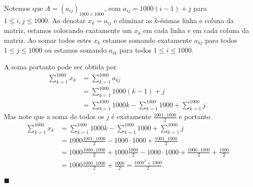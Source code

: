 \documentclass[a4paper,11pt]{report}
\renewcommand{\baselinestretch}{1.3}   %
\newenvironment{solucao}{ \vspace{.5\baselineskip} \renewcommand{\baselinestretch}{1}
                           \noindent {\bfseries Solução:} }
                        { \vspace{.5\baselineskip} \renewcommand{\baselinestretch}{1.2}
                           \hfill {\small $\blacksquare$} }
\begin{document}
\begin{solucao}
    Notemos que $A = (a_{ij})_{1000 \times 1000}$, com $a_{ij} = 1000(i-1) + j$ para $1 \leq i, j \leq 1000$. Ao denotar
    $x_{k} = a_{ij}$ e eliminar as $k$-ésimas linha e coluna da matriz, estamos colocando exatamente um $x_{k}$ em cada
    linha e em cada coluna da matriz. Ao somar todos estes $x_{k}$ estamos somando exatamente $a_{kj}$ para todos $1 \leq j
        \leq 1000$ ou estamos somando $a_{ik}$ para todos $1 \leq i \leq 1000$.

    A soma portanto pode ser obtida por
    \begin{align*}
        \sum_{k=1}^{1000} x_{k} & = \sum_{k=1}^{1000} a_{kj}                                                \\
                                & = \sum_{k=1}^{1000} 1000(k-1) + j                                         \\
                                & = \sum_{k=1}^{1000} 1000k - \sum_{k=1}^{1000} 1000 + \sum_{k=1}^{1000} j.
    \end{align*}
    Mas note que a soma de todos os $j$ é exatamente $\frac{1001 \cdot 1000}{2}$ e portanto
    \begin{align*}
        \sum_{k=1}^{1000} x_{k} & = \sum_{k=1}^{1000} 1000k - \sum_{k=1}^{1000} 1000 + \sum_{k=1}^{1000} j                                              \\
                                & = 1000 \frac{1001 \cdot 1000}{2} - 1000 \cdot 1000 + \frac{1001 \cdot 1000}{2}                                        \\
                                & = 1000 \frac{1000 \cdot 1000}{2} + 1000 \frac{1000}{2} - 1000 \cdot 1000 + \frac{1000 \cdot 1000}{2} + \frac{1000}{2} \\
                                & = 1000 \frac{1000 \cdot 1000}{2} + \frac{1000}{2} = \frac{1000^{3}+1000}{2}.
    \end{align*}


\end{solucao}
\end{document}

